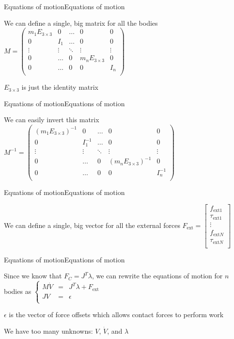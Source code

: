 \documentclass{beamer}
\begin{document}
\begin{slide}{Equations of motion}{Equations of motion}{
\item We can define a single, big matrix for all the bodies 
$M = \left( \begin{matrix}
m_1 E _{3 \times 3} & 0 & \dots & 0 & 0  \\
0 & I_1 & \dots & 0 & 0  \\
\vdots & \vdots & \ddots & \vdots & \vdots \\
0 & \dots & 0 & m_n E _{3 \times 3} & 0  \\
0 & \dots & 0 & 0 & I_n \\
\end{matrix} \right)$
\item $E_{3 \times 3}$ is just the identity matrix
}\end{slide}

\begin{slide}{Equations of motion}{Equations of motion}{
\item We can easily invert this matrix
$M^{-1} = \left( \begin{matrix}
(m_1 E _{3 \times 3})^{-1} & 0 & \dots & 0 & 0  \\
0 & I_1^{-1} & \dots & 0 & 0  \\
\vdots & \vdots & \ddots & \vdots & \vdots \\
0 & \dots & 0 & (m_n E _{3 \times 3})^{-1} & 0  \\
0 & \dots & 0 & 0 & I_n^{-1} \\
\end{matrix} \right)$
}\end{slide}

\begin{slide}{Equations of motion}{Equations of motion}{
\item We can define a single, big vector for all the external forces 
$F_{\text{ext}} = \left[ \begin{matrix}
f_{\text{ext}1} \\
\tau_{\text{ext}1} \\
\vdots \\
f_{\text{ext}N} \\
\tau_{\text{ext}N} \\
\end{matrix} \right]$
}\end{slide}

\begin{slide}{Equations of motion}{Equations of motion}{
\item Since we know that $F_C = J^T \lambda$, we can rewrite the equations of motion for $n$ bodies as
$\left\{ \begin{matrix}
M \dot V & = & J^T \lambda + F_{\text{ext}} \\
JV & = & \epsilon \\
\end{matrix} \right.$
\item $\epsilon$ is the vector of force offsets which allows contact forces to perform work
\item We have too many unknowns: $V$, $\dot V$, and $\lambda$
}\end{slide}
\end{document}
